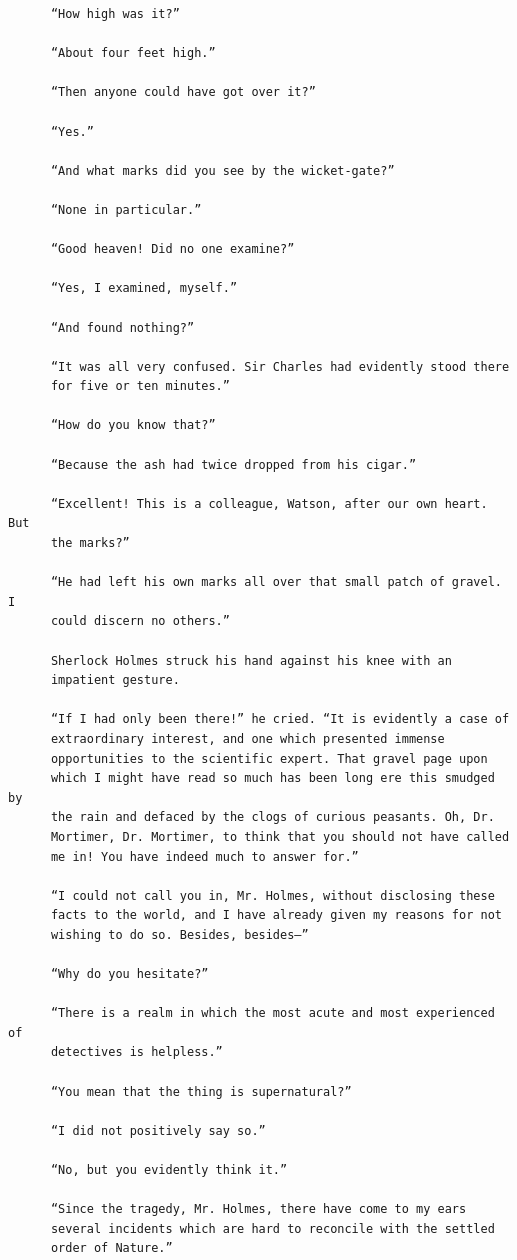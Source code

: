 \documentclass{article}
\begin{document}
\begin{verbatim}
      “How high was it?”

      “About four feet high.”

      “Then anyone could have got over it?”

      “Yes.”

      “And what marks did you see by the wicket-gate?”

      “None in particular.”

      “Good heaven! Did no one examine?”

      “Yes, I examined, myself.”

      “And found nothing?”

      “It was all very confused. Sir Charles had evidently stood there
      for five or ten minutes.”

      “How do you know that?”

      “Because the ash had twice dropped from his cigar.”

      “Excellent! This is a colleague, Watson, after our own heart. But
      the marks?”

      “He had left his own marks all over that small patch of gravel. I
      could discern no others.”

      Sherlock Holmes struck his hand against his knee with an
      impatient gesture.

      “If I had only been there!” he cried. “It is evidently a case of
      extraordinary interest, and one which presented immense
      opportunities to the scientific expert. That gravel page upon
      which I might have read so much has been long ere this smudged by
      the rain and defaced by the clogs of curious peasants. Oh, Dr.
      Mortimer, Dr. Mortimer, to think that you should not have called
      me in! You have indeed much to answer for.”

      “I could not call you in, Mr. Holmes, without disclosing these
      facts to the world, and I have already given my reasons for not
      wishing to do so. Besides, besides—”

      “Why do you hesitate?”

      “There is a realm in which the most acute and most experienced of
      detectives is helpless.”

      “You mean that the thing is supernatural?”

      “I did not positively say so.”

      “No, but you evidently think it.”

      “Since the tragedy, Mr. Holmes, there have come to my ears
      several incidents which are hard to reconcile with the settled
      order of Nature.”


\end{verbatim}
\end{document}
